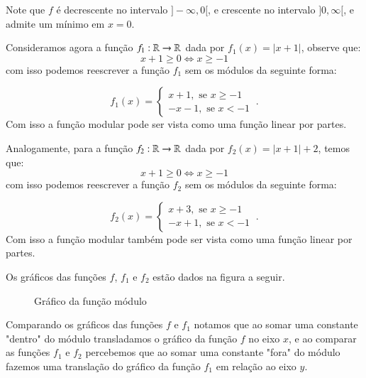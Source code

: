   Note que $f$ é decrescente no intervalo $]-\infty, 0[$, e crescente no intervalo $]0, \infty[$, e admite um mínimo em $x=0$.
  
  Consideramos agora a função $f_1: \mathbb{R} \rightarrow \mathbb{R}$ dada por $f_1(x)= |x+1|$, observe que:
  \[x+1 \geq 0 \Leftrightarrow  x \geq -1\]
  com isso podemos reescrever a função $f_1$ sem os módulos da seguinte forma:
  
  \[f_1(x)= \begin{cases}
                 x + 1, \text{ se } x \geq -1 \\
                 -x - 1, \text{ se } x < -1
                \end{cases} \ .\]
  Com isso a função modular pode ser vista como uma função linear por partes.
  
  Analogamente, para a função $f_2: \mathbb{R} \rightarrow \mathbb{R}$ dada por $f_2(x)= |x+1|+2$, temos que:
  \[x+1 \geq 0 \Leftrightarrow  x \geq -1\]
  com isso podemos reescrever a função $f_2$ sem os módulos da seguinte forma:
  
  \[f_2(x)= \begin{cases}
                 x + 3, \text{ se } x \geq -1 \\
                 -x + 1, \text{ se } x < -1
                \end{cases} \ .\]
  Com isso a função modular também pode ser vista como uma função linear por partes.
  
  Os gráficos das funções $f$, $f_1$ e $f_2$ estão dados na figura a seguir.  
  
  \begin{figure}[H]
 \centering
    \caption{Gráfico da função módulo}
  \end{figure}
  
  Comparando os gráficos das funções $f$ e $f_1$ notamos que ao somar uma constante "dentro" do módulo transladamos o gráfico da função $f$ no eixo $x$, e ao comparar as funções $f_1$ e $f_2$ percebemos que ao somar uma constante "fora" do módulo fazemos uma translação do gráfico da função $f_1$ em relação ao eixo $y$.
  
